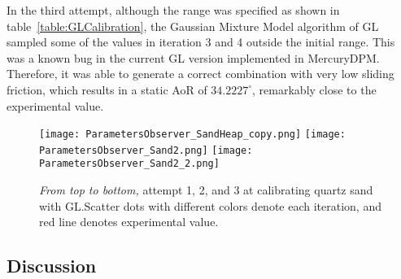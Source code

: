 In the third attempt, although the range was specified as shown in table~\ref{table:GLCalibration}, the Gaussian Mixture Model algorithm of GL sampled some of the values in iteration 3 and 4 outside the initial range. This was a known bug in the current GL version implemented in MercuryDPM. Therefore, it was able to generate a correct combination with very low sliding friction, which results in a static AoR of $34.2227^{\circ}$, remarkably close to the experimental value. 


\begin{figure}[H]
    \centering
    \texttt{[image: ParametersObserver\_SandHeap\_copy.png]}
    \texttt{[image: ParametersObserver\_Sand2.png]}
    \texttt{[image: ParametersObserver\_Sand2\_2.png]}
    \caption{\textit{From top to bottom,} attempt 1, 2, and 3 at calibrating quartz sand with GL.\@ Scatter dots with different colors denote each iteration, and red line denotes experimental value.}\label{fig:QuartzGL}
\end{figure}

\begin{table}[ht]
    \centering
    \caption{Calibration results of sand with GL.}\label{table:resSandGL}
\end{table}
    \subsection{Discussion} 
 
